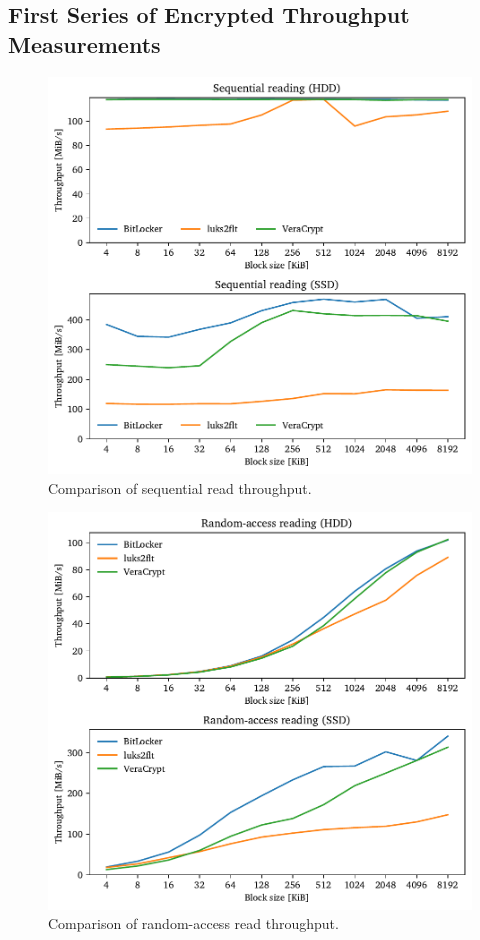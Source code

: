 \subsection{First Series of Encrypted Throughput Measurements}
\label{chap:performance.results.encryptedseries1}
\begin{figure}[htb!]
	\center
	\includegraphics[scale=1]{../fig/performance.results.beforeoptseq.pdf}
	\caption[
		Comparison of sequential read throughput
	]{
		Comparison of sequential read throughput. 
	}
	\label{fig:performance.results.beforeoptseq}
\end{figure}

\begin{figure}[htb!]
	\center
	\includegraphics[scale=1]{../fig/performance.results.beforeoptrand.pdf}
	\caption[
		Comparison of random-access read throughput
	]{
		Comparison of random-access read throughput. 
	}
	\label{fig:performance.results.beforeoptrand}
\end{figure}

